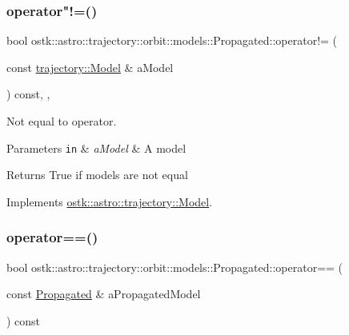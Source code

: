 \subsubsection{\texorpdfstring{operator"!=()}{operator!=()}\hspace{0.1cm}{\footnotesize\ttfamily [2/2]}}
{\footnotesize\ttfamily bool ostk\+::astro\+::trajectory\+::orbit\+::models\+::\+Propagated\+::operator!= (\begin{DoxyParamCaption}\item[{const \hyperlink{classostk_1_1astro_1_1trajectory_1_1_model}{trajectory\+::\+Model} \&}]{a\+Model }\end{DoxyParamCaption}) const\hspace{0.3cm}{\ttfamily [override]}, {\ttfamily [protected]}, {\ttfamily [virtual]}}



Not equal to operator. 


\begin{DoxyParams}[1]{Parameters}
\mbox{\tt in}  & {\em a\+Model} & A model \\
\hline
\end{DoxyParams}
\begin{DoxyReturn}{Returns}
True if models are not equal 
\end{DoxyReturn}


Implements \hyperlink{classostk_1_1astro_1_1trajectory_1_1_model_a2dd77b9f6939d738f3a489f26c955340}{ostk\+::astro\+::trajectory\+::\+Model}.

\mbox{\label{classostk_1_1astro_1_1trajectory_1_1orbit_1_1models_1_1_propagated_a88777b83d939ca894a20af525db347b8}} 
\subsubsection{\texorpdfstring{operator==()}{operator==()}\hspace{0.1cm}{\footnotesize\ttfamily [1/2]}}
{\footnotesize\ttfamily bool ostk\+::astro\+::trajectory\+::orbit\+::models\+::\+Propagated\+::operator== (\begin{DoxyParamCaption}\item[{const \hyperlink{classostk_1_1astro_1_1trajectory_1_1orbit_1_1models_1_1_propagated}{Propagated} \&}]{a\+Propagated\+Model }\end{DoxyParamCaption}) const}



